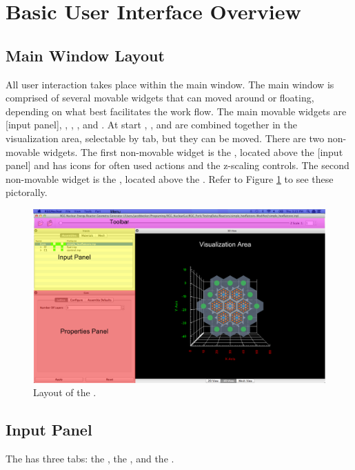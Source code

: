 \section{Basic User Interface Overview}
\subsection{Main Window Layout}
All user interaction takes place within the main window.  The main window is comprised of several movable widgets that can moved around or floating, depending on what best facilitates the work flow.  The main movable widgets are [input panel], ,  , , and .  At start , , and  are combined together in the visualization area, selectable by tab, but they can be moved.  There are two non-movable widgets.  The first non-movable widget is the , located above the [input panel] and has icons for often used actions and the z-scaling controls.  The second non-movable widget is the , located above the . Refer to Figure \ref{fig:mainwindow1} to see these pictorally.

\begin{figure}[H]
	\begin{center}
		\includegraphics[width=\linewidth]{Images/main-window-layout.png}
		\caption{Layout of the .}
		\label{fig:mainwindow1}
	\end{center}
\end{figure}


\subsection{Input Panel}
The  has three tabs: the , the , and the .


